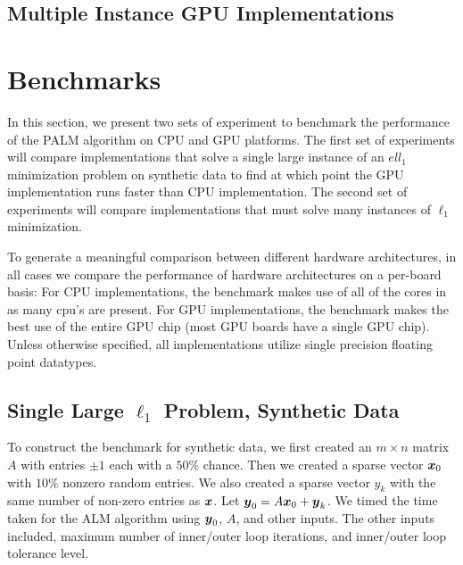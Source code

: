 \documentclass[10pt,twocolumn,letterpaper]{article}
\begin{document}
\subsection{Multiple Instance GPU Implementations}


\section{Benchmarks}
In this section, we present two sets of experiment to benchmark the performance
of the PALM algorithm on CPU and GPU platforms. 
The first set of experiments will compare implementations that solve a single
large instance of an $ell_1$ minimization problem on synthetic data to find at which
point the GPU implementation runs faster than CPU implementation.  
The second set of experiments will compare implementations that must solve
many instances of $\ell_1$ minimization.  

To generate a meaningful comparison between different hardware architectures,
in all cases we compare the performance of hardware architectures on a
per-board basis:  For CPU implementations, the benchmark makes use of all of
the cores in as many cpu's are present.  For GPU implementations, the benchmark
makes the best use of the entire GPU chip (most GPU boards have a single GPU
chip).  Unless otherwise specified, all implementations utilize single
precision floating point datatypes.  

\subsection{Single Large $\ell_1$ Problem, Synthetic Data}

To construct the benchmark for synthetic data, we first created an $m \times n$
matrix $A$ with entries $\pm 1$ each with a $50\%$ chance.  Then we created a
sparse vector ${\boldsymbol{x}}_0$ with $10\%$ nonzero random entries.  We also created a
sparse vector $y_k$ with the same number of non-zero entries as ${\boldsymbol{x}}$.  Let
$\boldsymbol{y}_0 = A {\boldsymbol{x}}_0 + \boldsymbol{y}_k$.  We timed the time taken for the ALM algorithm using
$\boldsymbol{y}_0$, $A$, and other inputs.  The other inputs included, maximum number of
inner/outer loop iterations, and inner/outer loop tolerance level.
\end{document}
